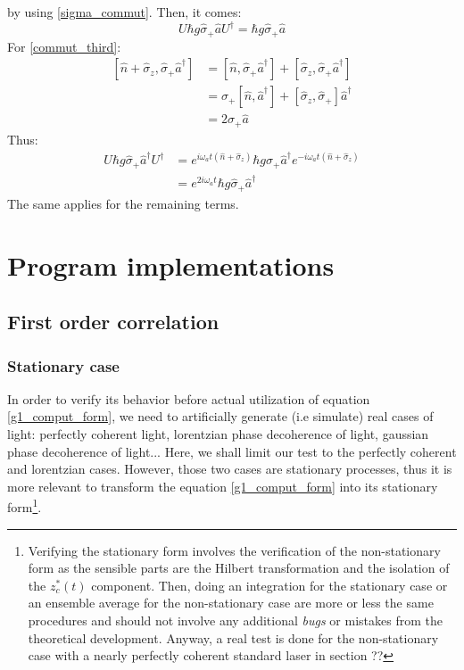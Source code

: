 \documentclass[12pt]{report}
\begin{document}
by using \eqref{sigma_commut}.
Then, it comes:
\begin{equation}
U\hbar g\hat{\sigma}_+\hat{a}U^\dag = \hbar g\hat{\sigma}_+\hat{a}
\end{equation}
For \eqref{commut_third}:
\begin{align}
\left[ \hat{n} + \hat{\sigma}_z, \hat{\sigma}_+ \hat{a}^\dag \right] &= \left[ \hat{n}, \hat{\sigma}_+ \hat{a}^\dag \right] + \left[ \hat{\sigma}_z, \hat{\sigma}_+ \hat{a}^\dag \right]\\
&= \hat{\sigma}_+ \left[ \hat{n}, \hat{a}^\dag \right] + \left[ \hat{\sigma}_z, \hat{\sigma}_+ \right] \hat{a}^\dag\\
&= 2\hat{\sigma}_+\hat{a}
\end{align}
Thus:
\begin{align}
U\hbar g\hat{\sigma}_+\hat{a}^\dag U^\dag &= e^{i\omega_a t(\hat{n} + \hat{\sigma}_z)}\hbar g\hat{\sigma}_+\hat{a}^\dag e^{-i\omega_a t(\hat{n} + \hat{\sigma}_z)}\\
&= e^{2i\omega_a t}\hbar g\hat{\sigma}_+\hat{a}^\dag
\end{align}
The same applies for the remaining terms.

\chapter{Program implementations}
\section{First order correlation}

\subsection{Stationary case}

In order to verify its behavior before actual utilization of equation \eqref{g1_comput_form}, we need to artificially generate (i.e simulate) real cases of light: perfectly coherent light, lorentzian phase decoherence of light, gaussian phase decoherence of light... Here, we shall limit our test to the perfectly coherent and lorentzian cases. However, those two cases are stationary processes, thus it is more relevant to transform the equation \eqref{g1_comput_form} into its stationary form\footnote{Verifying the stationary form involves the verification of the non-stationary form as the sensible parts are the Hilbert transformation and the isolation of the $z_c^*(t)$ component. Then, doing an integration for the stationary case or an ensemble average for the non-stationary case are more or less the same procedures and should not involve any additional \textit{bugs} or mistakes from the theoretical development. Anyway, a real test is done for the non-stationary case with a nearly perfectly coherent standard laser in section ??}.
\end{document}
